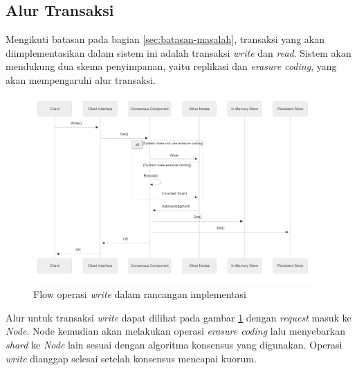 \subsection{Alur Transaksi}
\label{subsection:system-flow}

Mengikuti batasan pada bagian \ref{sec:batasan-masalah}, transaksi yang akan diimplementasikan dalam sistem ini adalah transaksi \textit{write} dan \textit{read}. Sistem akan mendukung dua skema penyimpanan, yaitu replikasi dan \textit{erasure coding}, yang akan mempengaruhi alur transaksi.

\begin{figure}[!ht]
    \centering
    \includegraphics[width=0.95\textwidth]{resources/chapter-3/flow-write.png}
    \caption{Flow operasi \textit{write} dalam rancangan implementasi}
    \label{fig:flow-write-mermaidjs}
\end{figure}

Alur untuk transaksi \textit{write} dapat dilihat pada gambar \ref{fig:flow-write-mermaidjs} dengan \textit{request} masuk ke \textit{Node}. Node kemudian akan melakukan operasi \textit{erasure coding} lalu menyebarkan \textit{shard} ke \textit{Node} lain sesuai dengan algoritma konsensus yang digunakan. Operasi \textit{write} dianggap selesai setelah konsensus mencapai kuorum.

